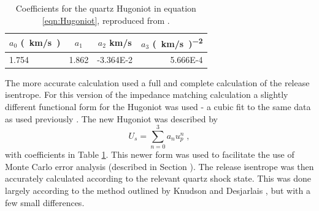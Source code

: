 
\begin{table}%
\centering
\caption{\label{tab:HugoniotCoeffs}%
Coefficients for the quartz Hugoniot in equation \ref{eqn:Hugoniot}, reproduced from \cite{Knudson2013}.
}
\begin{tabular}{lccr}
\hline\hline
\textrm{$a_0$ \si[per-mode=symbol]{(km/s)}}&
\textrm{$a_1$}&
\textrm{$a_2$ \si[per-mode=symbol]{\kilo\meter\per\second} }&
\textrm{$a_3$ \si[per-mode=symbol]{(km/s)^{-2}} } \\
\hline
1.754 & \num{1.862} & \num{-3.364E-2} & \num{5.666E-4}\\
\hline\hline
\end{tabular}
\end{table}

The more accurate calculation used a full and complete calculation of the release isentrope. For this version of the impedance matching calculation a slightly different functional form for the Hugoniot was used \cite{Knudson2013} - a cubic fit to the same data as used previously \cite{Knudson2009}. The new Hugoniot was described by \begin{equation} \label{eqn:Hugoniot} U_s = \sum_{n=0}^3 a_n u_p^n \;, \end{equation} with coefficients in Table \ref{tab:HugoniotCoeffs}. This newer form was used to facilitate the use of Monte Carlo error analysis (described in Section \label{MC error}). The release isentrope was then accurately calculated according to the relevant quartz shock state. This was done largely according to the method outlined by Knudson and Desjarlais \cite{Knudson2013}, but with a few small differences. 

